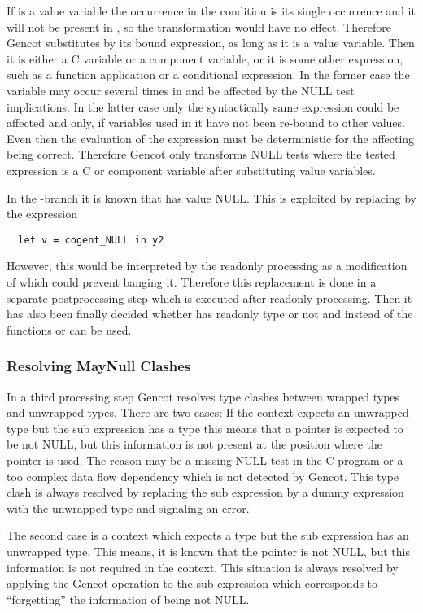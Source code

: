 If  is a value variable the occurrence in the condition is its single occurrence and it will not be present in , so the
transformation would have no effect. Therefore Gencot substitutes  by its bound expression, as long as it is a value variable.
Then it is either a C variable or a component variable, or it is some other expression, such as a function application or a conditional
expression. In the former case the variable may occur several times in  and be affected by the NULL test implications. In the
latter case only the syntactically same expression could be affected and only, if variables used in it have not been re-bound to other
values. Even then the evaluation of the expression must be deterministic for the affecting being correct. Therefore Gencot only transforms
NULL tests where the tested expression is a C or component variable after substituting value variables.

In the -branch it is known that  has value NULL. This is exploited by replacing  by the expression
\begin{verbatim}
  let v = cogent_NULL in y2
\end{verbatim}
However, this would be interpreted by the readonly processing as a modification of  which could prevent banging it. Therefore
this replacement is done in a separate postprocessing step which is executed after readonly processing. Then it has also been finally
decided whether  has readonly type or not and instead of  the functions  or  can be
used.

\subsubsection{Resolving MayNull Clashes}

In a third processing step Gencot resolves type clashes between  wrapped types and unwrapped types. There are two cases:
If the context expects an unwrapped type but the sub expression has a  type this means that a pointer is expected to
be not NULL, but this information is not present at the position where the pointer is used. The reason may be a missing NULL test in
the C program or a too complex data flow dependency which is not detected by Gencot. This type clash is always resolved by replacing
the sub expression by a dummy expression with the unwrapped type and signaling an error.

The second case is a context which expects a  type but the sub expression has an unwrapped type. This means, it is known
that the pointer is not NULL, but this information is not required in the context. This situation is always resolved by applying the
Gencot operation  to the sub expression which corresponds to ``forgetting'' the information of being not NULL.

